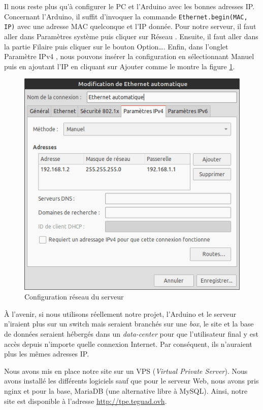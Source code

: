 Il nous reste plus qu'à configurer le PC et l'Arduino avec les bonnes adresses IP. Concernant l'Arduino, il suffit d'invoquer la commande \verb-Ethernet.begin(MAC, IP)- avec une adresse MAC quelconque et l'IP donnée. Pour notre serveur, il faut aller dans \og Paramètres système \fg{} puis cliquer sur \og Réseau \fg. Ensuite, il faut aller dans la partie \og Filaire \fg{} puis cliquer sur le bouton \og Option\dots \fg. Enfin, dans l'onglet \og Paramètre IPv4 \fg, nous pouvons insérer la configuration en sélectionnant \og Manuel \fg{} puis en ajoutant l'IP en cliquant sur \og Ajouter \fg{} comme le montre la figure \ref{fig:configuration-reseau}.

\begin{figure}[!h]
	\centering
	\includegraphics[width=.5\linewidth]{Images/Parametres_reseau_Linux}
	\caption{Configuration réseau du serveur}
	\label{fig:configuration-reseau}
\end{figure}

\Espace

À l'avenir, si nous utilisons réellement notre projet, l'Arduino et le serveur n'iraient plus sur un switch mais seraient branchés sur une \emph{box}, le site et la base de données seraient hébergés dans un \emph{data-center} pour que l'utilisateur final y est accès depuis n'importe quelle connexion Internet. Par conséquent, ils n'auraient plus les mêmes adresses IP.

Nous avons mis en place notre site sur un VPS (\emph{Virtual Private Server}). Nous avons installé les différents logiciels sauf que pour le serveur Web, nous avons pris nginx et pour la base, MariaDB (une alternative libre à MySQL). Ainsi, notre site est disponible à l'adresse \url{http://tpe.teguad.ovh}.
